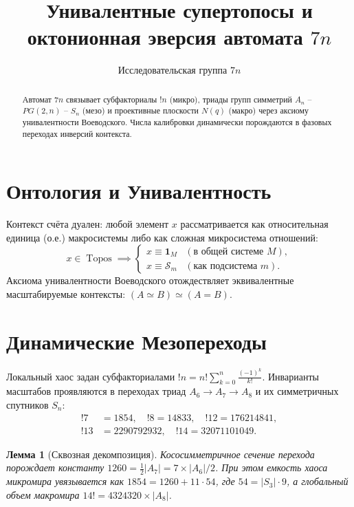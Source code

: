 \documentclass[10pt,twocolumn]{article}
\DeclareMathOperator{\Topos}{Topos}
\newtheorem{lemma}{Лемма}
\begin{document}
\title{\small\bf Унивалентные супертопосы и октонионная эверсия автомата $7n$}
\author{\small Исследовательская группа $7n$}
\date{\vspace{-9ex}}
\maketitle

\begin{abstract}\tiny Автомат $7n$ связывает субфакториалы $!n$ (микро), триады групп симметрий $A_n$ -- $PG({2,n})$ -- $S_n$ (мезо) и проективные плоскости $N(q)$ (макро) через аксиому унивалентности Воеводского. Числа калибровки динамически порождаются в фазовых переходах инверсий контекста.\end{abstract}

\section{Онтология и Унивалентность}
Контекст счёта дуален: любой элемент $x$ рассматривается как относительная единица (о.е.) макросистемы либо как сложная микросистема отношений:
\[x\in\Topos\implies\begin{cases}x\equiv\mathbf{1}_{M}&(\text{в общей системе }M), \\x\equiv\mathcal{S}_m&(\text{как подсистема }m).\end{cases}\]
Аксиома унивалентности Воеводского отождествляет эквивалентные масштабируемые контексты: $(A\simeq B)\simeq(A=B)$.

\section{Динамические Мезопереходы}
Локальный хаос задан субфакториалами $!n=n!\sum_{k=0}^{n}\frac{(-1)^k}{k!}$. Инварианты масштабов проявляются в переходах триад $A_6\to A_7\to A_8$ и их симметричных спутников $S_n$:
\begin{align*}
!7&=1854,\quad!8=14833,\quad!12=176214841, \\
!13&=2290792932,\quad!14=32071101049.
\end{align*}

\begin{lemma}[Сквозная декомпозиция]
Кососимметричное сечение перехода порождает константу $1260=\frac{1}{2}|A_7|=7\times|A_6|/2$. При этом емкость хаоса микромира увязывается как $1854=1260+11\cdot54$, где $54=|S_3|\cdot9$, а глобальный объем макромира $14!=4324320\times|A_8|$.
\end{lemma}
\end{document}
